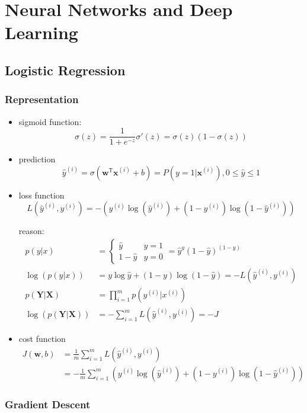 \ifx\PREAMBLE\undefined


\fi

\chapter{Neural Networks and Deep Learning}
\section{Logistic Regression}
\subsection{Representation}

\begin{itemize}
\item sigmoid function: 
\[\sigma(z)=\frac{1}{1+e^{-z}} \sigma'(z)=\sigma(z)(1-\sigma(z))\]
\item prediction
\[\hat{y}^{(i)}=\sigma(\mathbf{w}^{\mathsf{T}}\mathbf{x}^{(i)} + b)=P(y=1|\mathbf{x}^{(i)}), 0 \le \hat{y} \le 1\]
\item loss function
\[L(\hat{y}^{(i)}, y^{(i)})=-\left(y^{(i)}\log(\hat{y}^{(i)})+(1-y^{(i)})\log(1-\hat{y}^{(i)})\right)\]

reason: 
\begin{align*}
p(y|x)&=\begin{cases}
\hat{y} & y=1\\
1-\hat{y} & y=0
\end{cases}
=\hat{y}^y(1-\hat{y})^{(1-y)}\\
\log(p(y|x))&=y\log\hat{y}+(1-y)\log(1-\hat{y})=-L(\hat{y}^{(i)}, y^{(i)})\\
p(\mathbf{Y}|\mathbf{X})&=\displaystyle\prod_{i=1}^mp(y^{(i)}|x^{(i)})\\
\log\left(p(\mathbf{Y}|\mathbf{X})\right)&=-\displaystyle\sum_{i=1}^mL(\hat{y}^{(i)}, y^{(i)})=-J
\end{align*}

\item cost function
\begin{align*}
J(\mathbf{w},b)&=\frac{1}{m}\displaystyle\sum_{i=1}^mL(\hat{y}^{(i)}, y^{(i)})\\
&=-\frac{1}{m}\displaystyle\sum_{i=1}^{m}\left(y^{(i)}\log(\hat{y}^{(i)})+(1-y^{(i)})\log(1-\hat{y}^{(i)})\right)
\end{align*}
\end{itemize}

\subsection{Gradient Descent}

